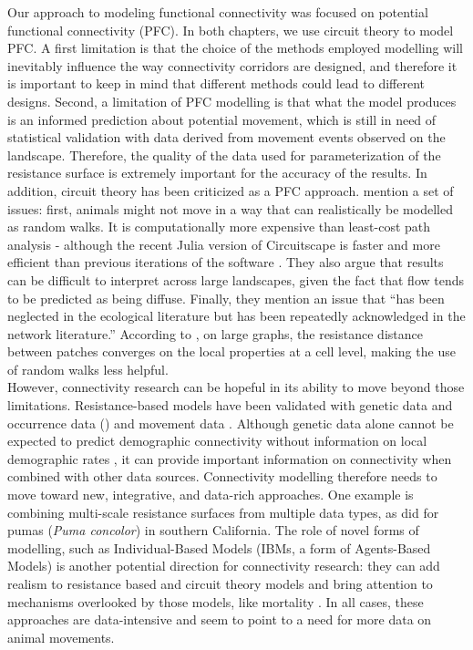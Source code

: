 \documentclass[12pt,Bold,TexShade]{thesis/mcgilletdclass}
\begin{document}
{Our approach to modeling functional connectivity was focused on potential functional connectivity (PFC). In both chapters, we use circuit theory to model PFC. A first limitation is that the choice of the methods employed modelling will inevitably influence the way connectivity corridors are designed, and therefore it is important to keep in mind that different methods could lead to different designs. Second, a limitation of PFC modelling is that what the model produces is an informed prediction about potential movement, which is still in need of statistical validation with data derived from movement events observed on the landscape. Therefore, the quality of the data used for parameterization of the resistance surface is extremely important for the accuracy of the results. In addition, circuit theory has been criticized as a PFC approach. \cite{fletcher_spatial_2018} mention a set of issues: first, animals might not move in a way that can realistically be modelled as random walks. It is computationally more expensive than least-cost path analysis - although the recent Julia version of Circuitscape is faster and more efficient than previous iterations of the software \citep{anantharaman_circuitscape_2020}. They also argue that results can be difficult to interpret across large landscapes, given the fact that flow tends to be predicted as being diffuse. Finally, they mention an issue that “has been neglected in the ecological literature but has been repeatedly acknowledged in the network literature.” According to \cite{luxburg_hitting_2014}, on large graphs, the resistance distance  between patches converges on the local properties at a cell level, making the use of random walks less helpful. \\

However, connectivity research can be hopeful in its ability to move beyond those limitations. Resistance-based models have been validated with genetic data \citep{marrotte_landscape_2014} and occurrence data (\cite{gray_landscape_2016}) and movement data \citep{lapoint_animal_2013}. Although genetic data alone cannot be expected to predict demographic connectivity without information on local demographic rates \citep{lowe_what_2010}, it can provide important information on connectivity when combined with other data sources. Connectivity modelling therefore needs to move toward new, integrative, and data-rich approaches. One example is combining multi-scale resistance surfaces from multiple data types, as \cite{zeller_multi-level_2017} did for pumas (\textit{Puma concolor}) in southern California. The role of novel forms of modelling, such as Individual-Based Models (IBMs, a form of Agents-Based Models) is another potential direction for connectivity research: they can add realism to resistance based and circuit theory models and bring attention to mechanisms overlooked by those models, like mortality \citep{day_individual-based_2020}. In all cases, these approaches are data-intensive and seem to point to a need for more data on animal movements. \\

}
\end{document}
